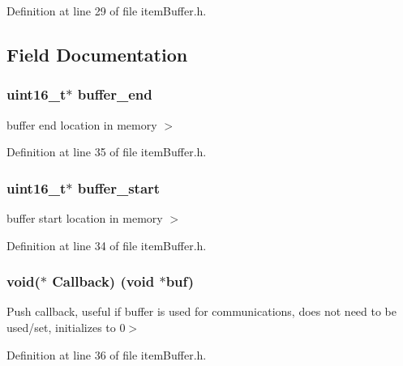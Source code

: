 Definition at line 29 of file item\+Buffer.\+h.



\subsection{Field Documentation}
\hypertarget{structitem__buffer__t_aa0fb18c2d69907cc4a924d4081447d24}{}
\subsubsection[{buffer\+\_\+end}]{\setlength{\rightskip}{0pt plus 5cm}uint16\+\_\+t$\ast$ buffer\+\_\+end}\label{structitem__buffer__t_aa0fb18c2d69907cc4a924d4081447d24}
buffer end location in memory $>$ 

Definition at line 35 of file item\+Buffer.\+h.

\hypertarget{structitem__buffer__t_afac3380a8905f54b8e8bff08d99dad6d}{}
\subsubsection[{buffer\+\_\+start}]{\setlength{\rightskip}{0pt plus 5cm}uint16\+\_\+t$\ast$ buffer\+\_\+start}\label{structitem__buffer__t_afac3380a8905f54b8e8bff08d99dad6d}
buffer start location in memory $>$ 

Definition at line 34 of file item\+Buffer.\+h.

\hypertarget{structitem__buffer__t_a7957c810329d9c779aad2a456bd77757}{}
\subsubsection[{Callback}]{\setlength{\rightskip}{0pt plus 5cm}void($\ast$ Callback) (void $\ast$buf)}\label{structitem__buffer__t_a7957c810329d9c779aad2a456bd77757}
Push callback, useful if buffer is used for communications, does not need to be used/set, initializes to 0$>$ 

Definition at line 36 of file item\+Buffer.\+h.

